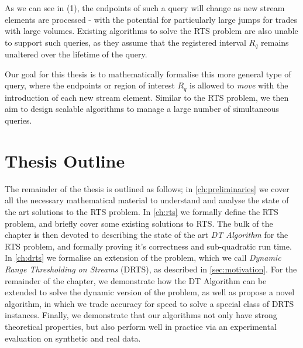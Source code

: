 As we can see in (1), the endpoints of such a query will change as new stream elements are processed - with the potential for particularly large jumps for trades with large volumes. Existing algorithms to solve the RTS problem are also unable to support such queries, as they assume that the registered interval $R_q$ remains unaltered over the lifetime of the query. 

Our goal for this thesis is to mathematically formalise this more general type of query, where the endpoints or region of interest $R_q$ is allowed to \textit{move} with the introduction of each new stream element. Similar to the RTS problem, we then aim to design scalable algorithms to manage a large number of simultaneous queries. 

\section{Thesis Outline}
\label{sec:doc-outline}

The remainder of the thesis is outlined as follows; in \cref{ch:preliminaries} we cover all the necessary mathematical material to understand and analyse the state of the art solutions to the RTS problem. In \cref{ch:rts} we formally define the RTS problem, and briefly cover some existing solutions to RTS. The bulk of the chapter is then devoted to describing the state of the art \textit{DT Algorithm} for the RTS problem, and formally proving it's correctness and sub-quadratic run time. In \cref{ch:drts} we formalise an extension of the problem, which we call \textit{Dynamic Range Thresholding on Streams} (DRTS), as described in \cref{sec:motivation}. For the remainder of the chapter, we demonstrate how the DT Algorithm can be extended to solve the dynamic version of the problem, as well as propose a novel algorithm, in which we trade accuracy for speed to solve a special class of DRTS instances. Finally, we demonstrate that our algorithms not only have strong theoretical properties, but also perform well in practice via an experimental evaluation on synthetic and real data. 
